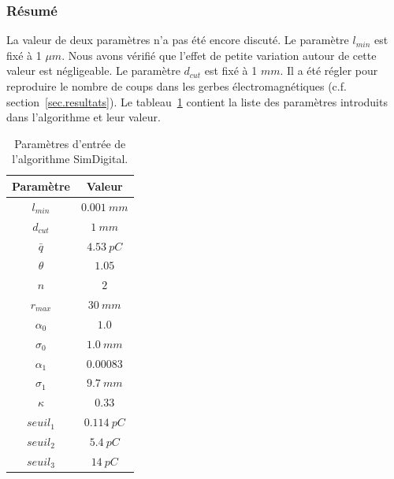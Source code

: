 \subsubsection{Résumé}
La valeur de deux paramètres n'a pas été encore discuté. Le paramètre $l_{min}$ est fixé à 1 $\mu m$. Nous avons vérifié que l'effet de petite variation autour de cette valeur est négligeable. Le paramètre $d_{cut}$ est fixé à 1 $mm$. Il a été régler pour reproduire le nombre de coups dans les gerbes électromagnétiques (c.f. section~\ref{sec.resultats}). Le tableau~\ref{tab.summary} contient la liste des paramètres introduits dans l'algorithme et leur valeur.
\begin{table}[!ht]
  \begin{center}
    \begin{tabular}{c||c}
      Paramètre & Valeur \\
      \hline
      \hline
      $l_{min}$ & $0.001\ mm$\\
      $d_{cut}$ & $1\ mm$ \\
      \hline
      $\bar q$ & $4.53\ pC$ \\
      $\theta$ & $1.05$ \\ 
      \hline
      $n$ & $2$ \\ 
      $r_{max}$ & $30\ mm$ \\
      $\alpha_0$ & $1.0$ \\
      $\sigma_0$ & $1.0\ mm$ \\
      $\alpha_1$ & $0.00083$ \\
      $\sigma_1$ & $9.7\ mm$ \\
      \hline
      $\kappa$ & $0.33$\\
      \hline 
      $seuil_1$ & $0.114\ pC$\\
      $seuil_2$ & $5.4\ pC$\\
      $seuil_3$ & $14\ pC$
    \end{tabular}
  \end{center}  
  \caption{Paramètres d'entrée de l'algorithme SimDigital.}
  \label{tab.summary}
\end{table}

